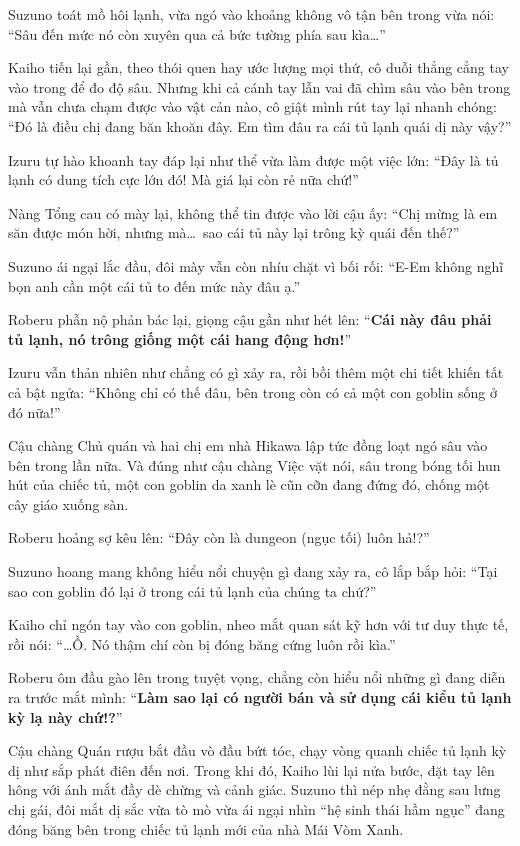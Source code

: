 \documentclass[../main.tex]{subfiles}
\begin{document}
Suzuno toát mồ hôi lạnh, vừa ngó vào khoảng không vô tận bên trong vừa nói: ``Sâu đến mức nó còn xuyên qua cả bức tường phía sau kìa\dots''

Kaiho tiến lại gần, theo thói quen hay ước lượng mọi thứ, cô duỗi thẳng cẳng tay vào trong để đo độ sâu. Nhưng khi cả cánh tay lẫn vai đã chìm sâu vào bên trong mà vẫn chưa chạm được vào vật cản nào, cô giật mình rút tay lại nhanh chóng: ``Đó là điều chị đang băn khoăn đây. Em tìm đâu ra cái tủ lạnh quái dị này vậy?''

Izuru tự hào khoanh tay đáp lại như thể vừa làm được một việc lớn: ``Đây là tủ lạnh có dung tích cực lớn đó! Mà giá lại còn rẻ nữa chứ!''

Nàng Tổng cau có mày lại, không thể tin được vào lời cậu ấy: ``Chị mừng là em săn được món hời, nhưng mà\dots\ sao cái tủ này lại trông kỳ quái đến thế?''

Suzuno ái ngại lắc đầu, đôi mày vẫn còn nhíu chặt vì bối rối: ``E-Em không nghĩ bọn anh cần một cái tủ to đến mức này đâu ạ.''

Roberu phẫn nộ phản bác lại, giọng cậu gần như hét lên: ``\textbf{Cái này đâu phải tủ lạnh, nó trông giống một cái hang động hơn!}''

Izuru vẫn thản nhiên như chẳng có gì xảy ra, rồi bồi thêm một chi tiết khiến tất cả bật ngửa: ``Không chỉ có thế đâu, bên trong còn có cả một con goblin sống ở đó nữa!''

Cậu chàng Chủ quán và hai chị em nhà Hikawa lập tức đồng loạt ngó sâu vào bên trong lần nữa. Và đúng như cậu chàng Việc vặt nói, sâu trong bóng tối hun hút của chiếc tủ, một con goblin da xanh lè cũn cỡn đang đứng đó, chống một cây giáo xuống sàn.

Roberu hoảng sợ kêu lên: ``Đây còn là dungeon (ngục tối) luôn hả!?''

Suzuno hoang mang không hiểu nổi chuyện gì đang xảy ra, cô lắp bắp hỏi: ``Tại sao con goblin đó lại ở trong cái tủ lạnh của chúng ta chứ?''

Kaiho chỉ ngón tay vào con goblin, nheo mắt quan sát kỹ hơn với tư duy thực tế, rồi nói: ``\dots Ồ. Nó thậm chí còn bị đóng băng cứng luôn rồi kìa.''


Roberu ôm đầu gào lên trong tuyệt vọng, chẳng còn hiểu nổi những gì đang diễn ra trước mắt mình: ``\textbf{Làm sao lại có người bán và sử dụng cái kiểu tủ lạnh kỳ lạ này chứ!?}''

Cậu chàng Quán rượu bắt đầu vò đầu bứt tóc, chạy vòng quanh chiếc tủ lạnh kỳ dị như sắp phát điên đến nơi. Trong khi đó, Kaiho lùi lại nửa bước, đặt tay lên hông với ánh mắt đầy dè chừng và cảnh giác. Suzuno thì nép nhẹ đằng sau lưng chị gái, đôi mắt dị sắc vừa tò mò vừa ái ngại nhìn ``hệ sinh thái hầm ngục'' đang đóng băng bên trong chiếc tủ lạnh mới của nhà Mái Vòm Xanh.
\end{document}
